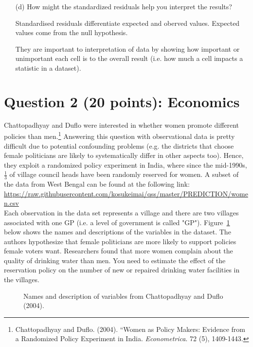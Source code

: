 \documentclass[12pt,letterpaper]{article}
\begin{document}
\begin{enumerate}
\begin{table}[h]
\begin{tabular}{l | c c c }
		\end{tabular}
	\end{table}
	
	
	\vspace{7cm}
	\item [(d)] How might the standardized residuals help you interpret the results?  
	
	Standardised residuals differentiate expected and oberved values. Expected values come from the null hypothesis.
	
	They are important to interpretation of data by showing how important or unimportant each cell is to the overall result (i.e. how much a cell impacts a statistic  in a dataset).
	
\end{enumerate}
\newpage

\section*{Question 2 (20 points): Economics}
Chattopadhyay and Duflo were interested in whether women promote different policies than men.\footnote{Chattopadhyay and Duflo. (2004). ``Women as Policy Makers: Evidence from a Randomized Policy Experiment in India. \textit{Econometrica}. 72 (5), 1409-1443.} Answering this question with observational data is pretty difficult due to potential confounding problems (e.g. the districts that choose female politicians are likely to systematically differ in other aspects too). Hence, they exploit a randomized policy experiment in India, where since the mid-1990s, $\frac{1}{3}$ of village council heads have been randomly reserved for women. A subset of the data from West Bengal can be found at the following link: \url{https://raw.githubusercontent.com/kosukeimai/qss/master/PREDICTION/women.csv}\\

\noindent Each observation in the data set represents a village and there are two villages associated with one GP (i.e. a level of government is called "GP"). Figure~\ref{fig:women_desc} below shows the names and descriptions of the variables in the dataset. The authors hypothesize that female politicians are more likely to support policies female voters want. Researchers found that more women complain about the quality of drinking water than men. You need to estimate the effect of the reservation policy on the number of new or repaired drinking water facilities in the villages.
\vspace{.5cm}
\begin{figure}[h!]
	\caption{\footnotesize{Names and description of variables from Chattopadhyay and Duflo (2004).}}
	\vspace{.5cm}
	\centering
	\label{fig:women_desc}

\end{figure}		
\end{document}
